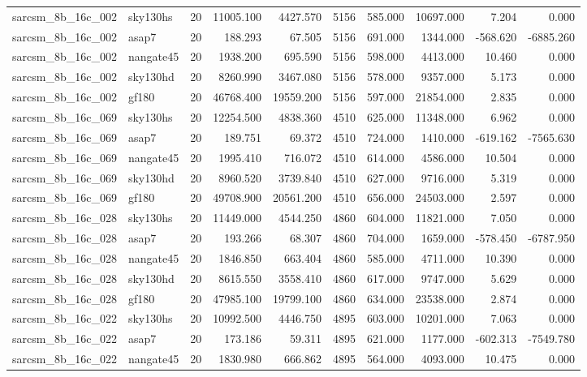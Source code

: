 \documentclass{article}
\begin{document}
\begin{longtable}{llrrrrrrrr}
sarcsm\_8b\_16c\_002 & sky130hs & 20 & 11005.100 & 4427.570 & 5156 & 585.000 & 10697.000 & 7.204 & 0.000 \\
sarcsm\_8b\_16c\_002 & asap7 & 20 & 188.293 & 67.505 & 5156 & 691.000 & 1344.000 & -568.620 & -6885.260 \\
sarcsm\_8b\_16c\_002 & nangate45 & 20 & 1938.200 & 695.590 & 5156 & 598.000 & 4413.000 & 10.460 & 0.000 \\
sarcsm\_8b\_16c\_002 & sky130hd & 20 & 8260.990 & 3467.080 & 5156 & 578.000 & 9357.000 & 5.173 & 0.000 \\
sarcsm\_8b\_16c\_002 & gf180 & 20 & 46768.400 & 19559.200 & 5156 & 597.000 & 21854.000 & 2.835 & 0.000 \\
sarcsm\_8b\_16c\_069 & sky130hs & 20 & 12254.500 & 4838.360 & 4510 & 625.000 & 11348.000 & 6.962 & 0.000 \\
sarcsm\_8b\_16c\_069 & asap7 & 20 & 189.751 & 69.372 & 4510 & 724.000 & 1410.000 & -619.162 & -7565.630 \\
sarcsm\_8b\_16c\_069 & nangate45 & 20 & 1995.410 & 716.072 & 4510 & 614.000 & 4586.000 & 10.504 & 0.000 \\
sarcsm\_8b\_16c\_069 & sky130hd & 20 & 8960.520 & 3739.840 & 4510 & 627.000 & 9716.000 & 5.319 & 0.000 \\
sarcsm\_8b\_16c\_069 & gf180 & 20 & 49708.900 & 20561.200 & 4510 & 656.000 & 24503.000 & 2.597 & 0.000 \\
sarcsm\_8b\_16c\_028 & sky130hs & 20 & 11449.000 & 4544.250 & 4860 & 604.000 & 11821.000 & 7.050 & 0.000 \\
sarcsm\_8b\_16c\_028 & asap7 & 20 & 193.266 & 68.307 & 4860 & 704.000 & 1659.000 & -578.450 & -6787.950 \\
sarcsm\_8b\_16c\_028 & nangate45 & 20 & 1846.850 & 663.404 & 4860 & 585.000 & 4711.000 & 10.390 & 0.000 \\
sarcsm\_8b\_16c\_028 & sky130hd & 20 & 8615.550 & 3558.410 & 4860 & 617.000 & 9747.000 & 5.629 & 0.000 \\
sarcsm\_8b\_16c\_028 & gf180 & 20 & 47985.100 & 19799.100 & 4860 & 634.000 & 23538.000 & 2.874 & 0.000 \\
sarcsm\_8b\_16c\_022 & sky130hs & 20 & 10992.500 & 4446.750 & 4895 & 603.000 & 10201.000 & 7.063 & 0.000 \\
sarcsm\_8b\_16c\_022 & asap7 & 20 & 173.186 & 59.311 & 4895 & 621.000 & 1177.000 & -602.313 & -7549.780 \\
sarcsm\_8b\_16c\_022 & nangate45 & 20 & 1830.980 & 666.862 & 4895 & 564.000 & 4093.000 & 10.475 & 0.000 \\

\end{longtable}
\end{document}
